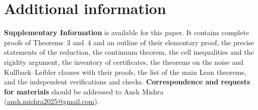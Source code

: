\documentclass[11pt]{article}
\begin{document}
\section*{Additional information}
\textbf{Supplementary Information} is available for this paper. It contains complete proofs of Theorems~3 and~4 and
an outline of their elementary proof, the precise statements of the reduction, the continuum theorem, the cell
inequalities and the rigidity argument, the inventory of certificates, the theorems on the noise and Kullback--Leibler
clauses with their proofs, the list of the main Lean theorems, and the independent verifications and checks.
\textbf{Correspondence and requests for materials} should be addressed to Ansh Mishra
(\href{mailto:ansh.mishra2025@gmail.com}{ansh.mishra2025@gmail.com}).
\end{document}
